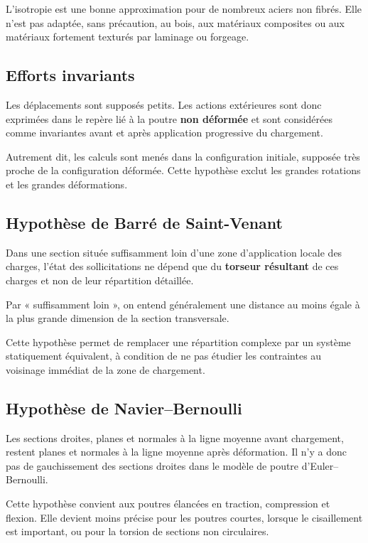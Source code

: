 L'isotropie est une bonne approximation pour de nombreux aciers non fibrés. Elle n'est pas adaptée, sans précaution, au bois, aux matériaux composites ou aux matériaux fortement texturés par laminage ou forgeage.

\subsection{Efforts invariants}

Les déplacements sont supposés petits. Les actions extérieures sont donc exprimées dans le repère lié à la poutre \textbf{non déformée} et sont considérées comme invariantes avant et après application progressive du chargement.

Autrement dit, les calculs sont menés dans la configuration initiale, supposée très proche de la configuration déformée. Cette hypothèse exclut les grandes rotations et les grandes déformations.

\subsection{Hypothèse de Barré de Saint-Venant}

Dans une section située suffisamment loin d'une zone d'application locale des charges, l'état des sollicitations ne dépend que du \textbf{torseur résultant} de ces charges et non de leur répartition détaillée.

Par « suffisamment loin », on entend généralement une distance au moins égale à la plus grande dimension de la section transversale.

\TLRDMSaintVenant

Cette hypothèse permet de remplacer une répartition complexe par un système statiquement équivalent, à condition de ne pas étudier les contraintes au voisinage immédiat de la zone de chargement.

\subsection{Hypothèse de Navier--Bernoulli}

Les sections droites, planes et normales à la ligne moyenne avant chargement, restent planes et normales à la ligne moyenne après déformation. Il n'y a donc pas de gauchissement des sections droites dans le modèle de poutre d'Euler--Bernoulli.

\TLRDMNavierBernoulli

Cette hypothèse convient aux poutres élancées en traction, compression et flexion. Elle devient moins précise pour les poutres courtes, lorsque le cisaillement est important, ou pour la torsion de sections non circulaires.

